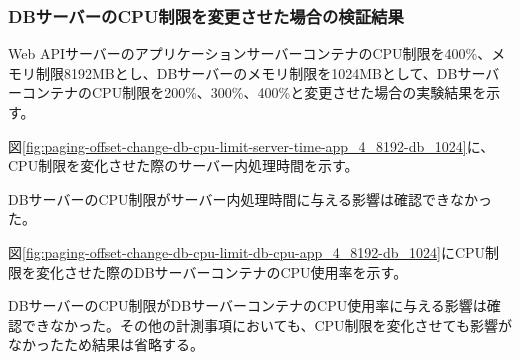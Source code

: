 \documentclass[../../../../main]{subfiles}
\begin{document}
    \subsubsection{DBサーバーのCPU制限を変更させた場合の検証結果}\label{subsubsec:result-paging-offset-change-db-cpu}

    Web APIサーバーのアプリケーションサーバーコンテナのCPU制限を400\%、メモリ制限8192MBとし、DBサーバーのメモリ制限を1024MBとして、DBサーバーコンテナのCPU制限を200\%、300\%、400\%と変更させた場合の実験結果を示す。


    図\ref{fig:paging-offset-change-db-cpu-limit-server-time-app_4_8192-db_1024}に、CPU制限を変化させた際のサーバー内処理時間を示す。

    

    DBサーバーのCPU制限がサーバー内処理時間に与える影響は確認できなかった。


    図\ref{fig:paging-offset-change-db-cpu-limit-db-cpu-app_4_8192-db_1024}にCPU制限を変化させた際のDBサーバーコンテナのCPU使用率を示す。

    

    DBサーバーのCPU制限がDBサーバーコンテナのCPU使用率に与える影響は確認できなかった。その他の計測事項においても、CPU制限を変化させても影響がなかったため結果は省略する。
\end{document}
